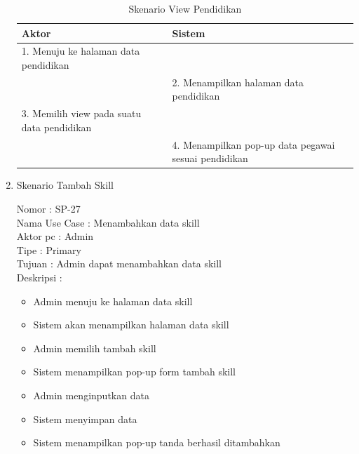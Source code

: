 \begin{enumerate}
\begin{itemize}
\end{itemize}

\begin{table}
	\caption{Skenario View Pendidikan}
	\centering
	\begin{tabular}{ | p{53mm} | p{75mm}|}
		\hline 
		\textbf{Aktor} & \textbf{Sistem} \\
		\hline
		
		1.	Menuju ke halaman data pendidikan &  \\
		
		\hline
		
		&  2.	Menampilkan halaman data pendidikan \\
		
		\hline
		
		3. Memilih view pada suatu data pendidikan & \\
		
		\hline
		
		& 4.	Menampilkan pop-up data pegawai sesuai pendidikan  \\
		\hline
		
	\end{tabular}
\end{table}

\item Skenario Tambah Skill

Nomor \kern 3.6pc : SP-27 \\
Nama Use Case : Menambahkan data skill \\
Aktor  pc : Admin \\
Tipe \kern 4.6pc : Primary \\
Tujuan \kern 3.6pc : Admin dapat menambahkan data skill \\
Deskripsi \kern 2.5pc : 

\begin{itemize}
	\item Admin menuju ke halaman data skill
	\item Sistem akan menampilkan halaman data skill
	\item Admin memilih tambah skill
	\item Sistem menampilkan pop-up form tambah skill
	\item Admin menginputkan data
	\item Sistem menyimpan data
	\item Sistem menampilkan pop-up tanda berhasil ditambahkan
	
\end{itemize}


\end{enumerate}
